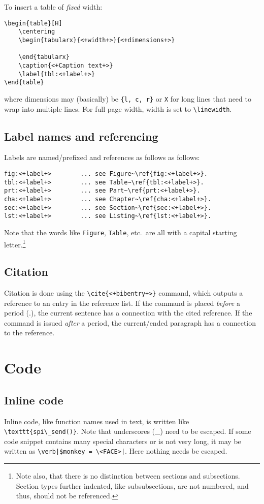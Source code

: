 To insert a table of \emph{fixed} width:
\begin{verbatim}
\begin{table}[H]
    \centering
    \begin{tabularx}{<+width+>}{<+dimensions+>}

    \end{tabularx}
    \caption{<+Caption text+>}
    \label{tbl:<+label+>}
\end{table}
\end{verbatim}
where dimensions may (basically) be \texttt{\{l, c, r\}} or \texttt{X} for long lines that need to wrap into multiple lines. For full page width, width is set to \verb|\linewidth|.


\subsection{Label names and referencing}
Labels are named\slash prefixed and references as follows as follows:
\begin{verbatim}
fig:<+label+>        ... see Figure~\ref{fig:<+label+>}. 
tbl:<+label+>        ... see Table~\ref{tbl:<+label+>}.
prt:<+label+>        ... see Part~\ref{prt:<+label+>}.
cha:<+label+>        ... see Chapter~\ref{cha:<+label+>}.
sec:<+label+>        ... see Section~\ref{sec:<+label+>}.
lst:<+label+>        ... see Listing~\ref{lst:<+label+>}.
\end{verbatim}
Note that the words like \texttt{Figure}, \texttt{Table}, etc.\ are all with a capital starting letter.\footnote{Note also, that there is no distinction between sections and subsections. Section types further indented, like subsubsections, are not numbered, and thus, should not be referenced.}


\subsection{Citation}
Citation is done using the \verb|\cite{<+bibentry+>}| command, which outputs a reference to an entry in the reference list. If the command is placed \emph{before} a period (.), the current sentence has a connection with the cited reference. If the command is issued \emph{after} a period, the current\slash ended paragraph has a connection to the reference.


\section{Code}
\label{sec:code}
\subsection{Inline code}
Inline code, like function names used in text, is written like \verb|\texttt{spi\_send()}|. Note that underscores (\_) need to be escaped. If some code snippet contains many special characters or is not very long, it may be written as \verb#\verb|$monkey = \<FACE>|#. Here nothing needs be escaped.


